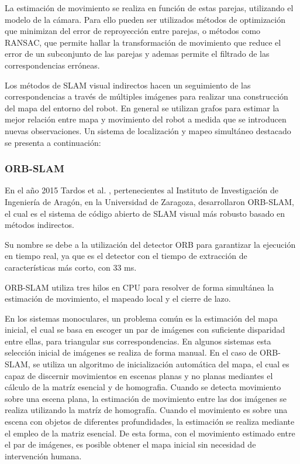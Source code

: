 La estimación de movimiento se realiza en función de estas parejas, utilizando el modelo de la cámara. Para ello pueden ser utilizados métodos de optimización que minimizan del error de reproyección entre parejas, o métodos como RANSAC, que permite hallar la transformación de movimiento que reduce el error de un subconjunto de las parejas y ademas permite el filtrado de las correspondencias erróneas.

Los métodos de SLAM visual indirectos hacen un seguimiento de las correspondencias a través de múltiples imágenes para realizar una construcción del mapa del entorno del robot. En general se utilizan grafos para estimar la mejor relación entre mapa y movimiento del robot a medida que se introducen nuevas observaciones. Un sistema de localización y mapeo simultáneo destacado se presenta a continuación:


\subsubsection{ORB-SLAM}

En el año 2015 Tardos et al. \cite{orbSlam}, pertenecientes al Instituto de Investigación de Ingeniería de Aragón, en la Universidad de Zaragoza,  desarrollaron ORB-SLAM, el cual es el sistema de código abierto de SLAM visual más robusto basado en métodos indirectos.

Su nombre se debe a la utilización del detector ORB para garantizar la ejecución en tiempo real, ya que es el detector con el tiempo de extracción de características más corto, con 33 ms.

ORB-SLAM utiliza tres hilos en CPU para resolver de forma simultánea la estimación de movimiento, el mapeado local y el cierre de lazo.

En los sistemas monoculares, un problema común es la estimación del mapa inicial, el cual se basa en escoger un par de imágenes con suficiente disparidad entre ellas, para triangular sus correspondencias. En algunos sistemas esta selección inicial de imágenes se realiza de forma manual. En el caso de ORB-SLAM, se utiliza un algoritmo de inicialización automática del mapa, el cual es capaz de discernir movimientos en escenas planas y no planas mediantes el cálculo de la matríz esencial y de homografia. Cuando se detecta movimiento sobre una escena plana, la estimación de movimiento entre las dos imágenes se realiza utilizando la matríz de homografía. Cuando el movimiento es sobre una escena con objetos de diferentes profundidades, la estimación se realiza mediante el empleo de la matriz esencial.  De esta forma, con el movimiento estimado entre el par de imágenes, es posible obtener el mapa inicial sin necesidad de intervención humana.

